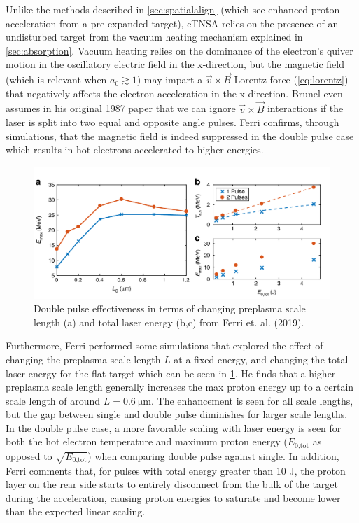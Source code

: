 Unlike the methods described in \cref{sec:spatialalign} (which see enhanced proton acceleration from a pre-expanded target), eTNSA relies on the presence of an undisturbed target from the vacuum heating mechanism\cite{Brunel_1987_PRL} explained in \cref{sec:absorption}. Vacuum heating relies on the dominance of the electron's quiver motion in the oscillatory electric field in the x-direction, but the magnetic field (which is relevant when $a_0 \gtrsim 1$) may impart a $\vec{v} \times \vec{B}$ Lorentz force (\cref{eq:lorentz}) that negatively affects the electron acceleration in the x-direction. Brunel even assumes in his original 1987 paper\cite{Brunel_1987_PRL} that we can ignore $\vec{v} \times \vec{B}$ interactions if the laser is split into two equal and opposite angle pulses. Ferri confirms\cite{Ferri_2019_Nat_Comm}, through simulations, that the magnetic field is indeed suppressed in the double pulse case which results in hot electrons accelerated to higher energies. 

\begin{figure}
	\centering 
	\includegraphics[width=\linewidth]{planning/images/ferri_scale_energy.PNG}
	\caption{Double pulse effectiveness in terms of changing preplasma scale length (a) and total laser energy (b,c) from Ferri et. al. (2019)\cite{Ferri_2019_Nat_Comm}.}
	\label{fig:ferri_scale_energy}
\end{figure}

Furthermore, Ferri performed some simulations that explored the effect of changing the preplasma scale length $L$ at a fixed energy, and changing the total laser energy for the flat target\cite{Ferri_2019_Nat_Comm} which can be seen in \cref{fig:ferri_scale_energy}. He finds that a higher preplasma scale length generally increases the max proton energy up to a certain scale length of around $L = \SI{0.6}{\micro \meter}$. The enhancement is seen for all scale lengths, but the gap between single and double pulse diminishes for larger scale lengths. In the double pulse case, a more favorable scaling with laser energy is seen for both the hot electron temperature and maximum proton energy ($E_\text{0,tot}$ as opposed to $\sqrt{E_\text{0,tot}}$) when comparing double pulse against single. In addition, Ferri comments that, for pulses with total energy greater than 10 J, the proton layer on the rear side starts to entirely disconnect from the bulk of the target during the acceleration, causing proton energies to saturate and become lower than the expected linear scaling.

